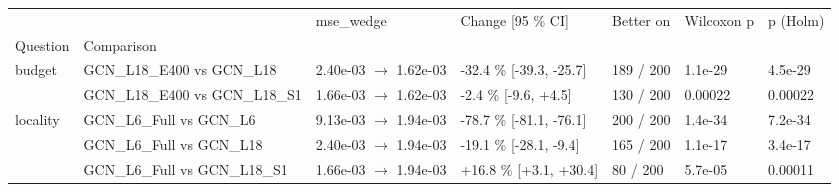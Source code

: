 \begin{tabular}{lllllll}
\toprule
 &  & mse\_wedge & Change [95 \% CI] & Better on & Wilcoxon p & p (Holm) \\
Question & Comparison &  &  &  &  &  \\
\midrule
\multirow[t]{2}{*}{budget} & GCN\_L18\_E400 vs GCN\_L18 & 2.40e-03 $\rightarrow$ 1.62e-03 & -32.4 \% [-39.3, -25.7] & 189 / 200 & 1.1e-29 & 4.5e-29 \\
 & GCN\_L18\_E400 vs GCN\_L18\_S1 & 1.66e-03 $\rightarrow$ 1.62e-03 & -2.4 \% [-9.6, +4.5] & 130 / 200 & 0.00022 & 0.00022 \\
\cline{1-7}
\multirow[t]{3}{*}{locality} & GCN\_L6\_Full vs GCN\_L6 & 9.13e-03 $\rightarrow$ 1.94e-03 & -78.7 \% [-81.1, -76.1] & 200 / 200 & 1.4e-34 & 7.2e-34 \\
 & GCN\_L6\_Full vs GCN\_L18 & 2.40e-03 $\rightarrow$ 1.94e-03 & -19.1 \% [-28.1, -9.4] & 165 / 200 & 1.1e-17 & 3.4e-17 \\
 & GCN\_L6\_Full vs GCN\_L18\_S1 & 1.66e-03 $\rightarrow$ 1.94e-03 & +16.8 \% [+3.1, +30.4] & 80 / 200 & 5.7e-05 & 0.00011 \\
\cline{1-7}
\bottomrule
\end{tabular}
